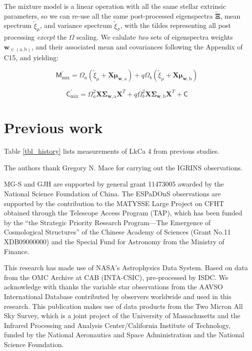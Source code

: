 \documentclass[twocolumn]{emulateapj}%
\newcommand{\iancze}{{\sc C15}}
\newcommand{\name}{LkCa 4 }
\begin{document}
The mixture model is a linear operation with all the same stellar extrinsic parameters, so we can re-use all the same post-processed eigenspectra $\widetilde{\mathbf{\Xi}}$, mean spectrum $\widetilde{\xi}_\mu$, and variance spectrum $\widetilde{\xi}_\sigma$, with the tildes representing all post processing \emph{except} the $\Omega$ scaling.  We calulate \emph{two} sets of eigenspectra weights $\mathbf{w}_{\in (\mathrm{a}, \mathrm{b})}$, and their associated mean and covariances following the Appendix of \iancze, and yielding:

\begin{equation}
  \mathsf{M}_{\mathrm{mix}}^\prime = \Omega_a (\widetilde{\xi}_\mu + \mathbf{X} \mathbf{\mu}_{\mathbf{w}, \mathrm{a}}) + q \Omega_b (\widetilde{\xi}_\mu + \mathbf{X} \mathbf{\mu}_{\mathbf{w}, \mathrm{b}})
\end{equation}

\begin{equation}
  \mathsf{C}_{\mathrm{mix}}^\prime = \Omega_a^2 \mathbf{X} \mathbf{\Sigma}_\mathbf{w, \mathrm{a}} \mathbf{X}^T + q \Omega_b^2 \mathbf{X} \mathbf{\Sigma}_\mathbf{w, \mathrm{b}} \mathbf{X}^T + \mathsf{C}
  \label{eqn:modC}
\end{equation}



\section{Previous work}

Table \ref{tbl_history} lists measurements of \name from previous studies.



\acknowledgements
The authors thank Gregory N. Mace for carrying out the IGRINS observations. 

MG-S and GJH are supported by general grant 11473005 awarded by the National Science Foundation of China.   The ESPaDOnS observations are supported by the contribution to the MATYSSE Large Project on CFHT obtained through the Telescope Access Program (TAP), which has been funded by the ``the Strategic Priority Research Program---The Emergence of Cosmological Structures'' of the Chinese Academy of Sciences (Grant No.11 XDB09000000) and the Special Fund for Astronomy from the Ministry of Finance. 

This research has made use of NASA's Astrophysics Data System.  
Based on data from the OMC Archive at CAB (INTA-CSIC), pre-processed by ISDC.
We acknowledge with thanks the variable star observations from the AAVSO International Database contributed by observers worldwide and used in this research.
This publication makes use of data products from the Two Micron All Sky Survey, which is a joint project of the University of Massachusetts and the Infrared Processing and Analysis Center/California Institute of Technology, funded by the National Aeronautics and Space Administration and the National Science Foundation.
\end{document}
